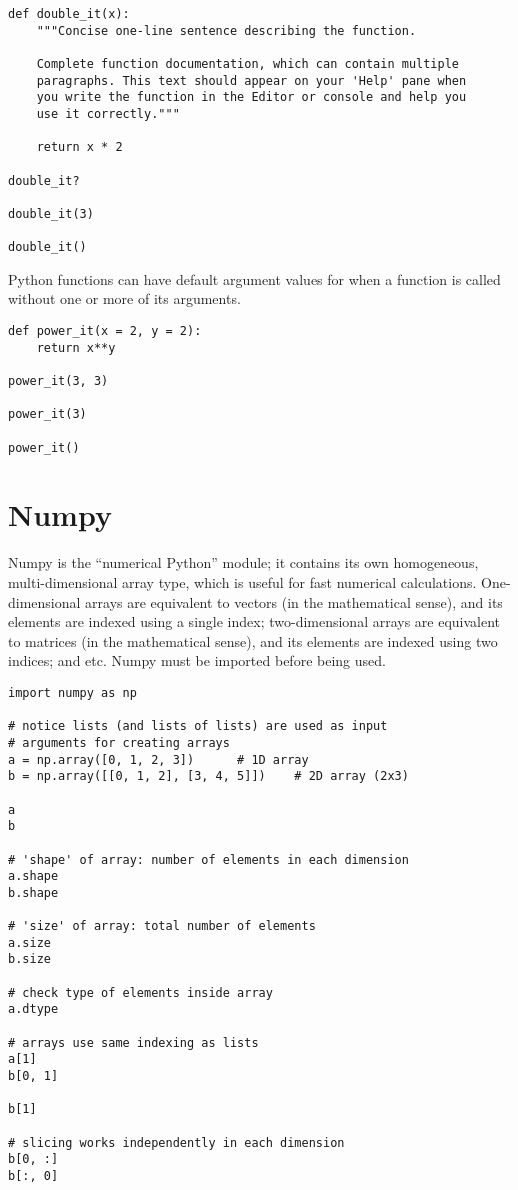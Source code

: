 \begin{lstlisting}[frame=single]
def double_it(x):
    """Concise one-line sentence describing the function.

    Complete function documentation, which can contain multiple
    paragraphs. This text should appear on your 'Help' pane when
    you write the function in the Editor or console and help you
    use it correctly."""
	
    return x * 2

double_it?

double_it(3)

double_it()
\end{lstlisting}

Python functions can have default argument values for when a function is called without one or more of its arguments.

\begin{lstlisting}[frame=single]
def power_it(x = 2, y = 2):
    return x**y

power_it(3, 3)

power_it(3)

power_it()
\end{lstlisting}

\section{Numpy}

Numpy is the ``numerical Python'' module; it contains its own homogeneous, multi-dimensional array type, which is useful for fast numerical calculations. One-dimensional arrays are equivalent to vectors (in the mathematical sense), and its elements are indexed using a single index; two-dimensional arrays are equivalent to matrices (in the mathematical sense), and its elements are indexed using two indices; and etc. Numpy must be imported before being used.

\begin{lstlisting}[frame=single]
import numpy as np

# notice lists (and lists of lists) are used as input
# arguments for creating arrays
a = np.array([0, 1, 2, 3])		# 1D array
b = np.array([[0, 1, 2], [3, 4, 5]])	# 2D array (2x3)

a
b

# 'shape' of array: number of elements in each dimension
a.shape
b.shape

# 'size' of array: total number of elements
a.size
b.size

# check type of elements inside array
a.dtype

# arrays use same indexing as lists
a[1]
b[0, 1]

b[1]

# slicing works independently in each dimension
b[0, :]
b[:, 0]
\end{lstlisting}

